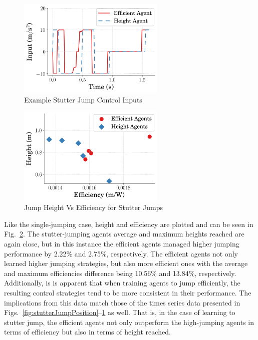 \documentclass{ifacconf}
\begin{document}
   \begin{figure}[tb]
      \begin{center}
         \includegraphics[width=7cm]{figures/timeseries/InputVsTime_StutterJump.png}    %
         \caption{Example Stutter Jump Control Inputs} 
         \label{fig:stutterJumpInput}
      \end{center}
   \end{figure}
   
   \begin{figure}[tb]
      \begin{center}
         \includegraphics[width=7cm]{figures/compare_agents/HeightVsEfficiency_StutterJump.png}    %
         \caption{Jump Height Vs Efficiency for Stutter Jumps} 
         \label{fig:stutterJumpComHeight}
      \end{center}
   \end{figure}

   Like the single-jumping case, height and efficiency are plotted and can be seen in Fig.~\ref{fig:stutterJumpComHeight}. The stutter-jumping agents average and maximum heights reached are again close, but in this instance the efficient agents managed higher jumping performance by 2.22\% and 2.75\%, respectively. The efficient agents not only learned higher jumping strategies, but also more efficient ones with the average and maximum efficiencies difference being 10.56\% and 13.84\%, respectively. Additionally, is is apparent that when training agents to jump efficiently, the resulting control strategies tend to be more consistent in their performance. The implications from this data match those of the times series data presented in Figs.~\ref{fig:stutterJumpPosition}--\ref{fig:stutterJumpInput} as well. That is, in the case of learning to stutter jump, the efficient agents not only outperform the high-jumping agents in terms of efficiency but also in terms of height reached. 
\end{document}
